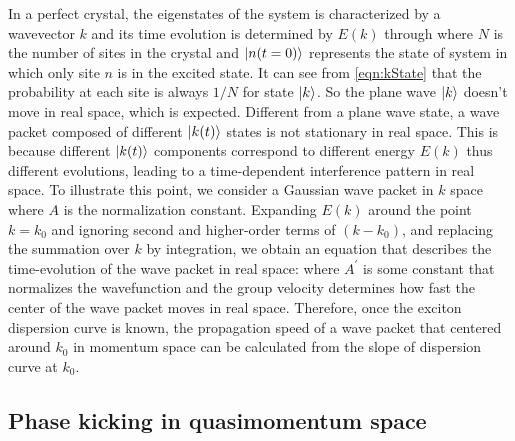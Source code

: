 In a perfect crystal, the eigenstates of the system is characterized by a wavevector $k$ and its time evolution is 
determined by $E(k)$ through
where $N$ is the number of sites in the crystal and $| n(t=0) \rangle$ represents the state of system in which only site
$n$ is in the excited state. It can see from \autoref{eqn:kState} that the probability at each site is always $1/N$ for 
state $| k \rangle$. So the plane wave $| k \rangle$ doesn't move in real space, which is expected. Different from a plane
 wave state, a wave packet composed of different $| k(t) \rangle$ states is not stationary in real space. This is because
 different $| k(t) \rangle$ components correspond to different energy $E(k)$ thus different evolutions, leading to a 
time-dependent interference pattern in real space. To illustrate this point, we consider a Gaussian wave packet in $k$
space 
where $A$ is the normalization constant. 
Expanding $E(k)$ around the point $k=k_0$ and ignoring second and higher-order terms of $(k-k_0)$, and replacing the
 summation over $k$ by integration, we obtain an equation that describes the time-evolution of the wave packet in 
real space:
where $A^{'}$ is some constant that normalizes the wavefunction and the group velocity
determines how fast the center of the wave packet moves in real space. Therefore, once the exciton dispersion curve is known, the propagation speed of a wave packet that centered around $k_0$ in momentum space can be calculated from the slope of dispersion curve at $k_0$.

\subsection{Phase kicking in quasimomentum space}


